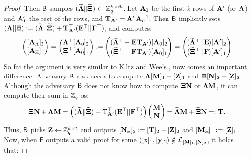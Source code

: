 \begin{proof}
Then $\mathsf{B}$ samples $(\widetilde{\mathbf{{\Lambda}}}||\widetilde{\mathbf{{\Xi}}}) \gets \mathbb{Z}_q^{k \times \tilde{m}}$.  Let $\mathbf{{A}}_0$ be the first $k$ rows of $\mathbf{{A}}'$ (or $\mathbf{{A}}$) and $\mathbf{{A}}_1'$ the rest of the rows, and $\mathbf{{T}}_{\mathbf{{A}}'}=\mathbf{{A}}'_1 \mathbf{{A}}_0^{-1}$. Then $\mathsf{B}$ implicitly sets 
$(\mathbf{{\Lambda}} || \mathbf{{\Xi}}):= (\widetilde{\mathbf{{\Lambda}}} || \widetilde{\mathbf{{\Xi}}})+ \mathbf{{T}}^{\top}_{\mathbf{{A}}'} (\mathbf{{E}}^{\top} || \mathbf{{F}}^{\top})$, and computes:
\begin{equation}
\begin{pmatrix}
[\matrA_{\Lambda}]_2\\
[\matrA_{\Xi}]_1
\end{pmatrix}=
\begin{pmatrix}
\matr{\Lambda}^{\top} [\matrA_0]_2\\
\matr{\Xi}^{\top} [\matrA_0]_1
\end{pmatrix}:=
\begin{pmatrix}
(\widetilde{\matr{\Lambda}}^{\top}+ \matr{E} \matr{T}_{\matrA'}) [\matrA_0]_2 \\
(\widetilde{\matr{\Xi}}^{\top}+ \matr{F} \matr{T}_{\matrA'}) [\matrA_0]_1
\end{pmatrix}
=
\begin{pmatrix}
(\widetilde{\matr{\Lambda}}^{\top}|| \matr{E}) [\matrA']_2 \\
(\widetilde{\matr{\Xi}}^{\top}|| \matr{F} ) [\matrA']_1
\end{pmatrix}
\end{equation}
So far the argument is very similar to Kiltz and Wee's \cite[Section~3.2]{EC:KilWee15}, now comes an important difference. 
Adversary $\mathsf{B}$ also needs to compute $\mathbf{{\Lambda}}[\mathbf{{M}}]_1+[\mathbf{{Z}}]_1$ and 
$\mathbf{{\Xi}}[\mathbf{{N}}]_2-[\mathbf{{Z}}]_2$. Although the adversary $\mathsf{B}$ does not know how to 
compute $\mathbf{{\Xi}}\mathbf{{N}}$ or $\mathbf{{\Lambda}}\mathbf{{M}}$, it can compute their sum in $\mathbb{Z}_q$ as:
 $$\mathbf{{\Xi}}\mathbf{{N}}+\mathbf{{\Lambda}}\mathbf{{M}}=
    \left(
        (\widetilde{\mathbf{{\Lambda}}} || \widetilde{\mathbf{{\Xi}}})
        + \mathbf{{T}}^{\top}_{\mathbf{{A}}'}(\mathbf{{E}}^{\top}||\mathbf{{F}}^{\top})
    \right)
 \begin{pmatrix}
    \mathbf{{M}} \\ \mathbf{{N}}
 \end{pmatrix} =\widetilde{\mathbf{{\Lambda}}} \mathbf{{M}}+\widetilde{\mathbf{{\Xi}}} \mathbf{{N}}=:\mathbf{{T}}.  
 $$
Thus, $\mathsf{B}$ picks $\mathbf{{Z}} \gets \mathbb{Z}_q^{k \times t}$ and outputs 
$[\mathbf{{N}}_{\Xi}]_2:=[\mathbf{{T}}]_2-[\mathbf{{Z}}]_2$ and  $[\mathbf{{M}}_{\Xi}]_1:=[\mathbf{{Z}}]_1$.
Now, when $\mathsf{F}$ outputs a valid proof for some $([\mathbf{x}]_1,[\mathbf{y}]_2) \notin \mathcal{L}_{[\mathbf{{M}}]_1,[\mathbf{{N}}]_2}$, it holds that:

\end{proof}
